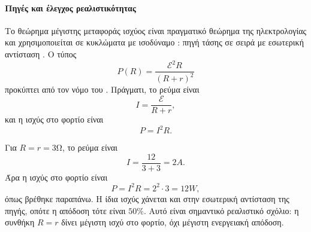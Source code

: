 \paragraph{Πηγές και έλεγχος ρεαλιστικότητας}
Το θεώρημα μέγιστης μεταφοράς ισχύος είναι πραγματικό θεώρημα της
ηλεκτρολογίας και χρησιμοποιείται σε κυκλώματα με ισοδύναμο
: πηγή τάσης σε σειρά με εσωτερική αντίσταση
\cite{maximumPowerTransferTheorem}. Ο τύπος
\[
  P(R)=\frac{\mathcal E^2R}{(R+r)^2}
\]
προκύπτει από τον νόμο του . Πράγματι, το ρεύμα είναι
\[
  I=\frac{\mathcal E}{R+r},
\]
και η ισχύς στο φορτίο είναι
\[
  P=I^2R.
\]

Για \(R=r=3\si{\ohm}\), το ρεύμα είναι
\[
  I=\frac{12}{3+3}=2\si{A}.
\]
Άρα η ισχύς στο φορτίο είναι
\[
  P=I^2R=2^2\cdot3=12\si{W},
\]
όπως βρέθηκε παραπάνω. Η ίδια ισχύς χάνεται και στην εσωτερική
αντίσταση της πηγής, οπότε η απόδοση τότε είναι \(50\%\). Αυτό είναι
σημαντικό ρεαλιστικό σχόλιο: η συνθήκη \(R=r\) δίνει μέγιστη ισχύ στο
φορτίο, όχι μέγιστη ενεργειακή απόδοση.
